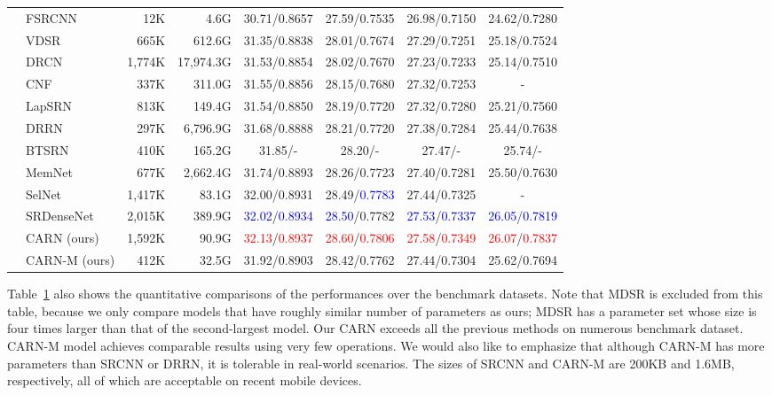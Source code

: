 \documentclass[runningheads]{llncs}
\newcommand{\blue}[1]{\textcolor{blue}{#1}}
\newcommand{\red}[1]{\textcolor{red}{#1}}
\newcommand\Bstrut{\rule[-1ex]{0pt}{0pt}}
\def\HS{\hspace{\fontdimen2\font}}
\def\HSE{\HS\HS\HS\HS\HS\HS\HS\HS}
\begin{document}
\begin{table}[t]
\begin{center}
\begin{tabular}{c l r r c c c c}
& FSRCNN\cite{fsrcnn2016}  & 12K    & 4.6G     & 30.71/0.8657 & 27.59/0.7535 & 26.98/0.7150 & 24.62/0.7280 \\
& VDSR\cite{vdsr2016}      & 665K   & 612.6G   & 31.35/0.8838 & 28.01/0.7674 & 27.29/0.7251 & 25.18/0.7524 \\
& DRCN\cite{drcn2016}      & 1,774K & 17,974.3G & 31.53/0.8854 & 28.02/0.7670 & 27.23/0.7233 & 25.14/0.7510 \\
& CNF\cite{cnf2017}        & 337K   & 311.0G   & 31.55/0.8856 & 28.15/0.7680 & 27.32/0.7253 & -\\
& LapSRN\cite{lapsrn2017}  & 813K   & 149.4G   & 31.54/0.8850 & 28.19/0.7720 & 27.32/0.7280 & 25.21/0.7560 \\
& DRRN\cite{drnn2017}      & 297K   & 6,796.9G & 31.68/0.8888 & 28.21/0.7720 & 27.38/0.7284 & 25.44/0.7638\\
& BTSRN\cite{btsrn2017}    & 410K   & 165.2G   & 31.85/-\HSE  & 28.20/-\HSE  & 27.47/-\HSE  & 25.74/-\HSE \\
& MemNet\cite{memnet}      & 677K   & 2,662.4G   & 31.74/0.8893 & 28.26/0.7723 & 27.40/0.7281 & 25.50/0.7630 \\
& SelNet\cite{selnet}      & 1,417K & 83.1G    & 32.00/0.8931 & 28.49/\blue{0.7783} & 27.44/0.7325 & - \\
& SRDenseNet\cite{srdense} & 2,015K & 389.9G   & \blue{32.02}/\blue{0.8934} & \blue{28.50}/0.7782 & \blue{27.53}/\blue{0.7337} & \blue{26.05}/\blue{0.7819} \\
& CARN (ours)              & 1,592K & 90.9G    & \red{32.13}/\red{0.8937} & \red{28.60}/\red{0.7806} & \red{27.58}/\red{0.7349}	& \red{26.07}/\red{0.7837} \\
& CARN-M (ours)            & 412K   & 32.5G    & 31.92/0.8903 & 28.42/0.7762 & 27.44/0.7304	& 25.62/0.7694\Bstrut\\\hline
\end{tabular}
\end{center}
\label{table:benchmark}
\end{table}

Table~\ref{table:benchmark} also shows the quantitative comparisons of the performances over the benchmark datasets. Note that MDSR is excluded from this table, because we only compare models that have roughly similar number of parameters as ours; MDSR has a parameter set whose size is four times larger than that of the second-largest model. Our CARN exceeds all the previous methods on numerous benchmark dataset.
CARN-M model achieves comparable results using very few operations. We would also like to emphasize that although CARN-M has more parameters than SRCNN or DRRN, it is tolerable in real-world scenarios. The sizes of SRCNN and CARN-M are 200KB and 1.6MB, respectively, all of which are acceptable on recent mobile devices.
\end{document}
